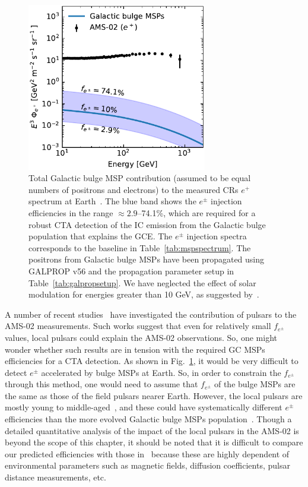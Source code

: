 \documentclass[doublespace,nopageskip]{VTthesis} %
\begin{document}
\begin{figure}[htb]
    \begin{center}
    \includegraphics[width=0.7\textwidth]{Figures/CTA/positrons_at_Earth.pdf}
    \caption{Total Galactic bulge MSP contribution (assumed to be equal numbers of positrons and electrons) to the measured CRs $e^+$ spectrum at Earth~\citep{2021PhR...894....1A}. The blue band shows the $e^\pm$ injection efficiencies in the range $\approx 2.9$--74.1\%, which are required for a robust CTA detection of the IC emission from the Galactic bulge population that explains the GCE. The $e^\pm$ injection spectra corresponds to the baseline in Table~\ref{tab:mspspectrum}.  The positrons from Galactic bulge MSPs have been propagated using \textsc{GALPROP} v56 and the propagation parameter setup in Table~\ref{tab:galpropsetup}. We have neglected the effect of solar modulation for energies greater than 10 GeV, as suggested by~\citet{2014AdSpR..53.1015S}.}\label{fig:MSPpositronsatEarth}
    \end{center}
 \end{figure}

A number of recent studies~\citep[e.g.,][]{2018PhRvD..98f3008C, 2020PhRvD.102b3015M} have investigated the contribution of pulsars to the AMS-02 measurements. Such works suggest that even for relatively small $f_{e^\pm}$ values, local pulsars could explain the AMS-02 observations. So, one might wonder whether such results are in tension with the required GC MSPs efficiencies for a CTA detection. As shown in Fig.~\ref{fig:MSPpositronsatEarth}, it would be very difficult to detect $e^\pm$ accelerated by bulge MSPs at Earth. So, in order to constrain the $f_{e^\pm}$ through this method, one would need to assume that $f_{e^\pm}$ of the bulge MSPs are the same as those of the field pulsars nearer Earth. However, the local pulsars are mostly young to middle-aged~\citep{2010A&A...524A..51D}, and these could have systematically different $e^\pm$ efficiencies than the more evolved Galactic bulge MSPs population~\citep{2021MNRAS.507.5161S}. Though a detailed quantitative analysis of the impact of the local pulsars in the AMS-02 is beyond the scope of this chapter, it should be noted that it is difficult to compare our predicted efficiencies with those in~\citep[e.g.,][]{2018PhRvD..98f3008C, 2020PhRvD.102b3015M} because these are highly dependent of environmental parameters such as magnetic fields, diffusion coefficients, pulsar distance measurements, etc.
\end{document}
